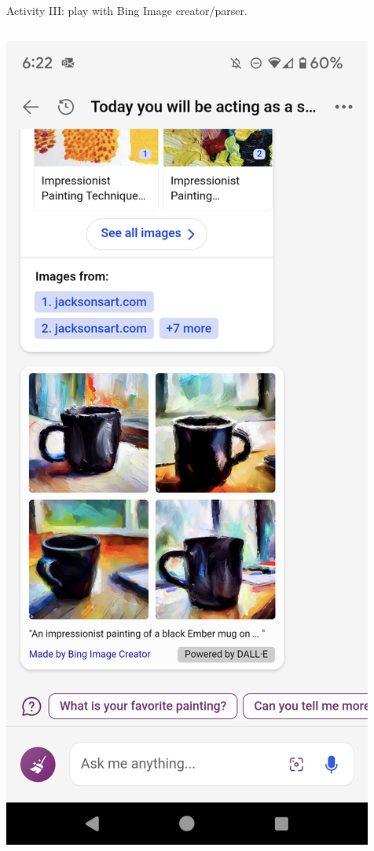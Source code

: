 \documentclass[aspectratio=169]{beamer}
\begin{document}
\begin{frame}{Activity III: play with Bing Image creator/parser.}
\begin{columns}
\begin{column}{.25\textwidth}
    \includegraphics[width=\textwidth]{Figures/Screenshot_20230919-182257.png}
    \end{column}
\end{columns}


    
\end{frame}
\end{document}
